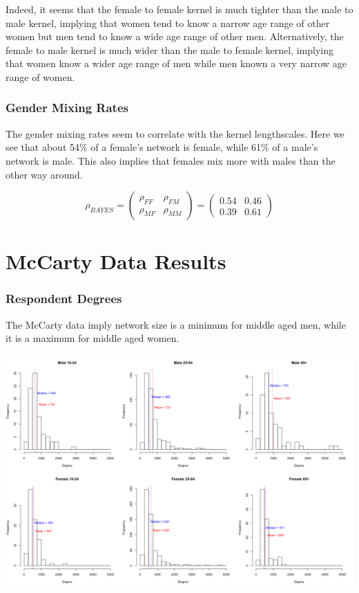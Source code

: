 \documentclass[12pt]{article}
\begin{document}
\noindent Indeed, it seems that the female to female kernel is much tighter than the male to male kernel, implying that women tend to know a narrow age range of other women but men tend to know a wide age range of other men. Alternatively, the female to male kernel is much wider than the male to female kernel, implying that women know a wider age range of men while men known a very narrow age range of women.

\subsubsection*{Gender Mixing Rates}
\noindent The gender mixing rates seem to correlate with the kernel lengthscales. Here we see that about 54\% of a female's network is female, while 61\% of a male's network is male. This also implies that females mix more with males than the other way around.

$$ \rho_{BAYES}
= \left( \begin{array}{cc} \rho_{FF} & \rho_{FM} \\
\rho_{MF} & \rho_{MM} \end{array} \right) 
= \left( \begin{array}{cc}
0.54 & 0.46 \\
0.39 & 0.61 \end{array} \right) $$

\pagebreak
\section{McCarty Data Results}
\subsubsection*{Respondent Degrees}
The McCarty data imply network size is a minimum for middle aged men, while it is a maximum for middle aged women.

\begin{center}
\includegraphics[scale = 0.33]{Estimates_Degree_McCarty.png}
\end{center}
\end{document}

